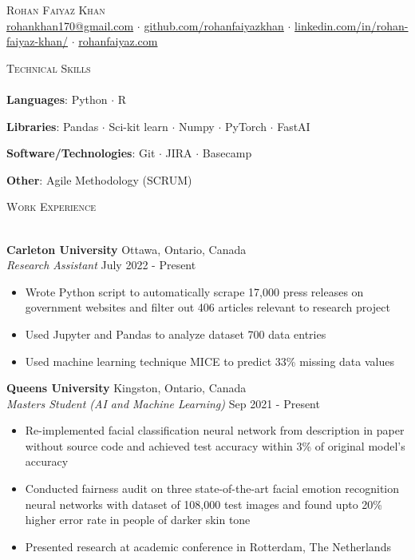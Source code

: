 \documentclass[a4paper]{article}
\newcommand{\lineunder} {
    \vspace*{-8pt} \\
    \hspace*{-18pt} \hrulefill \\
}
\newcommand{\header} [1] {
    {\hspace*{-18pt}\vspace*{6pt} \textsc{#1}}
    \vspace*{-6pt} \lineunder
}
\begin{document}
\vspace*{-40pt}

    

\vspace*{-10pt}
\begin{center}
	{\Huge \scshape {Rohan Faiyaz Khan}}\\
	\href{mailto:rohankhan170@gmail.com}{rohankhan170@gmail.com} $\cdot$ \href{https://www.github.com/rohanfaiyazkhan}{github.com/rohanfaiyazkhan} $\cdot$ \href{https://linkedin.com/in/rohan-faiyaz-khan/}{linkedin.com/in/rohan-faiyaz-khan/} $\cdot$  \href{https://rohanfaiyaz.com}{rohanfaiyaz.com} \\
\end{center}

\header{Technical Skills}

\textbf{Languages}: Python $\cdot$ R

\textbf{Libraries}: Pandas $\cdot$ Sci-kit learn $\cdot$ Numpy $\cdot$ PyTorch $\cdot$ FastAI

\textbf{Software/Technologies}: Git $\cdot$ JIRA $\cdot$ Basecamp

\textbf{Other}: Agile Methodology (SCRUM)

\vspace{2mm}

\header{Work Experience}
\vspace{1mm}

\textbf{Carleton University} \hfill Ottawa, Ontario, Canada\\
\textit{Research Assistant} \hfill July 2022 - Present\\
\vspace{-1mm}
\begin{itemize} \itemsep 1pt
	\item Wrote Python script to automatically scrape 17,000 press releases on government websites and filter out 406 articles relevant to research project
	\item Used Jupyter and Pandas to analyze dataset 700 data entries
	\item Used machine learning technique MICE to predict 33\% missing data values 
\end{itemize}

\textbf{Queen\textquotesingle{}s University} \hfill Kingston, Ontario, Canada\\
\textit{Master\textquotesingle{}s Student (AI and Machine Learning)} \hfill Sep 2021 - Present\\
\vspace{-1mm}
\begin{itemize} \itemsep 1pt
	\item Re-implemented facial classification neural network from description in paper without source code and achieved test accuracy within 3\% of original model's accuracy
	\item Conducted fairness audit on three state-of-the-art facial emotion recognition neural networks with dataset of 108,000 test images and found upto 20\% higher error rate in people of darker skin tone
	\item Presented research at academic conference in Rotterdam, The Netherlands
\end{itemize}
\end{document}
